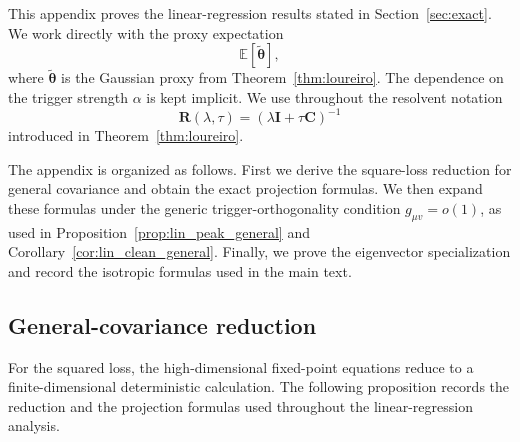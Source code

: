 \documentclass[11pt]{article}
\newcommand{\EE}{\mathbb{E}}
\newcommand{\I}{\mathbf{I}}
\newcommand{\C}{\mathbf{C}}
\newcommand{\btheta}{\boldsymbol{\theta}}
\begin{document}
This appendix proves the linear-regression results stated in
Section~\ref{sec:exact}. We work directly with the proxy expectation
\[
\EE[\tilde{\btheta}],
\]
where \(\tilde{\btheta}\) is the Gaussian proxy from
Theorem~\ref{thm:loureiro}. The dependence on the trigger strength
\(\alpha\) is kept implicit. We use throughout the resolvent notation
\[
\mathbf{R}(\lambda,\tau)=(\lambda\I+\tau\C)^{-1}
\]
introduced in Theorem~\ref{thm:loureiro}.

The appendix is organized as follows. First we derive the square-loss reduction
for general covariance and obtain the exact projection formulas. We then expand
these formulas under the generic trigger-orthogonality condition
\(g_{\mu v}=o(1)\), as used in Proposition~\ref{prop:lin_peak_general} and
Corollary~\ref{cor:lin_clean_general}. Finally, we prove the eigenvector
specialization and record the isotropic formulas used in the main text.


\subsection{General-covariance reduction}

For the squared loss, the high-dimensional fixed-point equations reduce to a
finite-dimensional deterministic calculation. The following proposition records
the reduction and the projection formulas used throughout the linear-regression
analysis.
\end{document}
